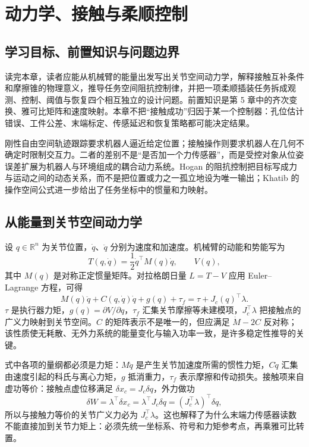 \chapter{动力学、接触与柔顺控制}
\label{chap:dynamics-contact-compliance}

\section{学习目标、前置知识与问题边界}

读完本章，读者应能从机械臂的能量出发写出关节空间动力学，解释接触互补条件和摩擦锥的物理意义，推导任务空间阻抗控制律，并把一项柔顺插装任务拆成观测、控制、阈值与恢复四个相互独立的设计问题。前置知识是第 5 章中的齐次变换、雅可比矩阵和速度映射。本章不把“接触成功”归因于某一个控制器：孔位估计错误、工件公差、末端标定、传感延迟和恢复策略都可能决定结果。

刚性自由空间轨迹跟踪要求机器人逼近给定位置；接触操作则要求机器人在几何不确定时限制交互力。二者的差别不是“是否加一个力传感器”，而是受控对象从位姿误差扩展为机器人与环境组成的耦合动力系统。Hogan 的阻抗控制把目标写成力与运动之间的动态关系，而不是把位置或力之一孤立地设为唯一输出\cite{hogan1985impedance}；Khatib 的操作空间公式进一步给出了任务坐标中的惯量和力映射\cite{khatib1987operational}。

\section{从能量到关节空间动力学}

设 $q\in\mathbb{R}^{n}$ 为关节位置，$\dot q$、$\ddot q$ 分别为速度和加速度。机械臂的动能和势能写为
\begin{equation}
T(q,\dot q)=\frac{1}{2}\dot q^\top M(q)\dot q,\qquad V(q),
\end{equation}
其中 $M(q)$ 是对称正定惯量矩阵。对拉格朗日量 $L=T-V$ 应用 Euler--Lagrange 方程，可得
\begin{equation}
M(q)\ddot q+C(q,\dot q)\dot q+g(q)+\tau_f
=\tau+J_c(q)^\top\lambda .
\label{eq:joint-dynamics}
\end{equation}
$\tau$ 是执行器力矩，$g(q)=\partial V/\partial q$，$\tau_f$ 汇集关节摩擦等未建模项，$J_c^\top\lambda$ 把接触点的广义力映射到关节空间。$C$ 的矩阵表示不是唯一的，但应满足 $\dot M-2C$ 反对称；该性质使无耗散、无外力系统的能量变化与输入功率一致，是许多稳定性推导的关键\cite{featherstone2008rigid,lynch2017modern}。

式中各项的量纲都必须是力矩：$M\ddot q$ 是产生关节加速度所需的惯性力矩，$C\dot q$ 汇集由速度引起的科氏与离心力矩，$g$ 抵消重力，$\tau_f$ 表示摩擦和传动损失。接触项来自虚功等价：接触点虚位移满足 $\delta x_c=J_c\delta q$，外力做功
\begin{equation}
\delta W=\lambda^\top\delta x_c
=\lambda^\top J_c\delta q
=(J_c^\top\lambda)^\top\delta q,
\end{equation}
所以与接触力等价的关节广义力必为 $J_c^\top\lambda$。这也解释了为什么末端力传感器读数不能直接加到关节力矩上：必须先统一坐标系、符号和力矩参考点，再乘雅可比转置。

